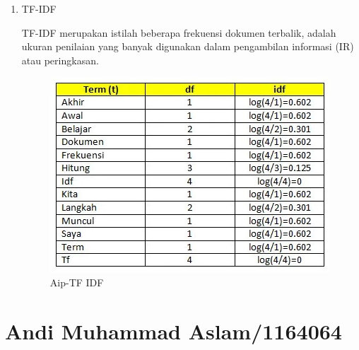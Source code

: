 \begin{enumerate}
\item TF-IDF
	\par TF-IDF merupakan istilah beberapa frekuensi dokumen terbalik, adalah ukuran penilaian yang banyak digunakan dalam pengambilan informasi (IR) atau peringkasan. 
	\begin{figure}[ht]
		\centering
		\includegraphics[scale=0.5]{figures/AIP/b5.PNG}
		\caption{Aip-TF IDF}
		\label{contoh}
	\end{figure}
\end{enumerate}




\section{Andi Muhammad Aslam/1164064}

